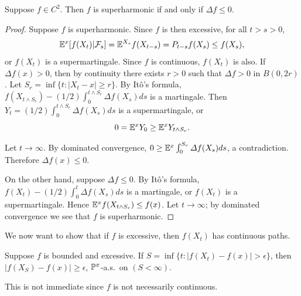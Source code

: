 \begin{proposition}\label{prop:ch2_6.8}
Suppose $f \in C^2$. Then $f$ is superharmonic if and only if $\Delta f \leq 0$.
\end{proposition}

\begin{proof}
Suppose $f$ is superharmonic. Since $f$ is then excessive, for all $t > s > 0$,
\begin{equation}\label{eq:ch2_6.2}
    \E^x[f(X_t)|\FC_s] = \E^{X_s}f(X_{t-s}) = P_{t-s}f(X_s) \leq f(X_s),
\end{equation}
\mnewpage
or $f(X_t)$ is a supermartingale. Since $f$ is continuous, $f(X_t)$ is also. If $\Delta  f(x) > 0$, then by continuity there exists $r > 0$ such that $\Delta f > 0$ in $B(0,2r)$. Let $S_r = \inf\{t : |X_t - x| \geq r\}$. By It\^o's formula, $f(X_{t\wedge S_r}) - (1/2)\int_0^{t\wedge S_r} \Delta  f(X_s)ds$ is a martingale. Then $Y_t = (1/2)\int_0^{t\wedge S_r} \Delta f(X_s)ds$ is a supermartingale, or
\[
    0 = \E^xY_0 \geq \E^xY_{t\wedge S_r}.
\]

Let $t \to \infty$. By dominated convergence, $0 \geq \E^x\int_0^{S_r} \Delta  f(X_s)ds$, a contradiction. Therefore $\Delta  f(x) \leq 0$.

On the other hand, suppose $\Delta  f \leq 0$. By It\^o's formula, $f(X_t) - (1/2)\int_0^t \Delta  f(X_s)ds$ is a martingale, or $f(X_t)$ is a supermartingale. Hence $\E^xf(X_{t\wedge S_r}) \leq f(x)$. Let $t \to \infty$; by dominated convergence we see that $f$ is superharmonic.
\end{proof}


We now want to show that if $f$ is excessive, then $f(X_t)$ has continuous paths.

\begin{proposition}\label{prop:ch2_6.9}
Suppose $f$ is bounded and excessive. If $S = \inf\{t : |f(X_t)-f(x)| > \epsilon\}$, then $|f(X_S) - f(x)| \geq \epsilon$, $\P^x$-a.s.\ on $(S < \infty)$.
\end{proposition}

This is not immediate since $f$ is not necessarily continuous.

